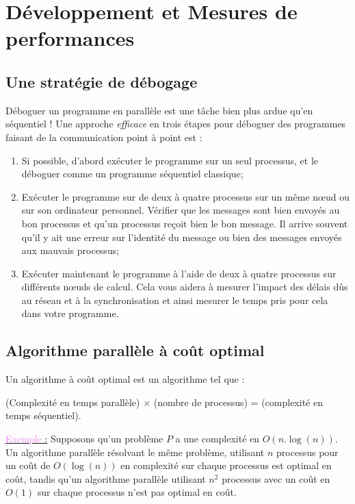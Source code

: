 \documentclass[fleqn,11pt]{article}
\begin{document}
\section{Développement et Mesures de performances}

\subsection{Une stratégie de débogage}

Déboguer un programme en parallèle est une tâche bien plus ardue qu'en séquentiel !
Une approche \textsl{efficace} en trois étapes pour déboguer des programmes faisant
de la communication point à point est :
\begin{enumerate}
 \item Si possible, d'abord exécuter le programme sur un seul processus, et le déboguer comme
 un programme séquentiel classique;
 \item Exécuter le programme sur de deux à quatre processus sur un même n{\oe}ud ou sur son ordinateur
 personnel. Vérifier que les messages sont bien envoyés au bon processus et qu'un processus reçoit bien
 le bon message. Il arrive souvent qu'il y ait une erreur sur l'identité du message ou bien des messages
 envoyés aux mauvais processus;
 \item Exécuter maintenant le programme à l'aide de deux à quatre processus sur différents
 n{\oe}uds de calcul. Cela vous aidera à mesurer l'impact des délais dûs au réseau et à la
 synchronisation et ainsi mesurer le temps pris pour cela dans votre programme.
\end{enumerate}


\subsection{Algorithme parallèle à coût optimal}

Un algorithme à coût optimal est un algorithme tel que :
\begin{center}
 (Complexité en temps parallèle) $\times$ (nombre de processus) = (complexité en temps séquentiel).
\end{center}

\underline{\textcolor{violet}{Exemple} :} Supposons qu'un problème $P$ a une complexité en $O(n.\log(n))$.
Un algorithme parallèle résolvant le même problème, utilisant $n$ processus pour un coût de $O(\log(n))$
en complexité sur chaque processus est optimal en coût, tandis qu'un algorithme parallèle utilisant
$n^{2}$ processus avec un coût en  $O(1)$ sur chaque processus n'est pas optimal en coût.
\end{document}
